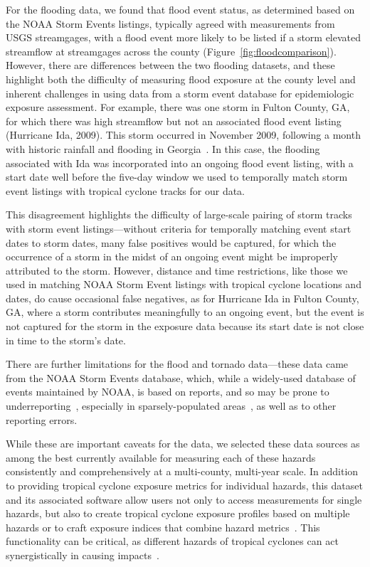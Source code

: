 For the flooding data, we found that flood event status, as determined based on
the NOAA Storm Events listings, typically agreed with measurements from
\ac{USGS} streamgages, with a flood event more likely to be listed if a storm
elevated streamflow at streamgages across the county
(Figure~\ref{fig:floodcomparison}).  However, there are differences between the
two flooding datasets, and these highlight both the difficulty of measuring
flood exposure at the county level and inherent challenges in using data from a
storm event database for epidemiologic exposure assessment.  For example, there
was one storm in Fulton County, GA, for which there was high streamflow but not
an associated flood event listing (Hurricane Ida, 2009).  This storm occurred
in November 2009, following a month with historic rainfall and flooding in
Georgia~\parencite{shepherd2011overview}.  In this case, the flooding
associated with Ida was incorporated into an ongoing flood event listing, with
a start date well before the five-day window we used to temporally match storm
event listings with tropical cyclone tracks for our data. 

This disagreement highlights the difficulty of large-scale pairing of storm
tracks with storm event listings---without criteria for temporally matching
event start dates to storm dates, many false positives would be
captured, for which the occurrence of a storm in the midst of an ongoing 
event might be improperly attributed to the storm.  However, distance
and time restrictions, like those we used in matching NOAA Storm Event listings
with tropical cyclone locations and dates, do cause 
occasional false negatives, as for Hurricane Ida in Fulton County, GA, where a
storm contributes meaningfully to an ongoing event, but the event is not
captured for the storm in the exposure data because its start date is not
close in time to the storm's date.  

There are further limitations for the flood and tornado data---these data came
from the \ac{NOAA} Storm Events database, which, while a widely-used database
of events maintained by \ac{NOAA}, is based on reports, and so may be prone to
underreporting~\parencite{Ashley2008flood, Curran2000}, especially in
sparsely-populated areas~\parencite{Witt1998, Ashley2007}, as well as to other
reporting errors. 

While these are important caveats for the data, we selected these data sources
as among the best currently available for measuring each of these hazards
consistently and comprehensively at a multi-county, multi-year scale. In
addition to providing tropical cyclone exposure metrics for individual hazards,
this dataset and its associated software allow users not only to access
measurements for single hazards, but also to create tropical cyclone exposure
profiles based on multiple hazards or to craft exposure indices that combine
hazard metrics~\parencite{chakraborty2005population, peduzzi2009assessing}.
This functionality can be critical, as different hazards of tropical cyclones can
act synergistically in causing impacts~\parencite{smith2009}.  

